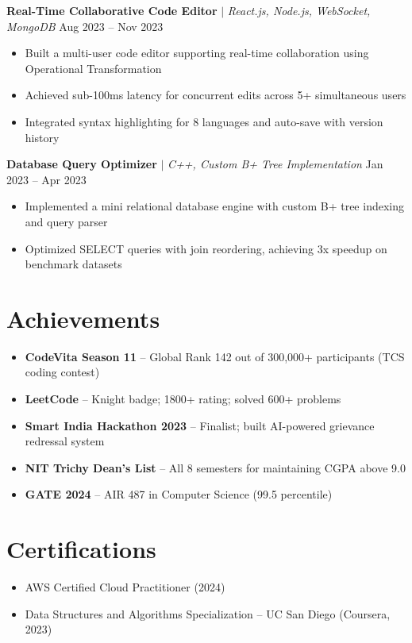 \documentclass[10pt,a4paper]{article}
\begin{document}
\textbf{Real-Time Collaborative Code Editor} $\mid$ \textit{React.js, Node.js, WebSocket, MongoDB} \hfill Aug 2023 -- Nov 2023
\begin{itemize}
    \item Built a multi-user code editor supporting real-time collaboration using Operational Transformation
    \item Achieved sub-100ms latency for concurrent edits across 5+ simultaneous users
    \item Integrated syntax highlighting for 8 languages and auto-save with version history
\end{itemize}

\textbf{Database Query Optimizer} $\mid$ \textit{C++, Custom B+ Tree Implementation} \hfill Jan 2023 -- Apr 2023
\begin{itemize}
    \item Implemented a mini relational database engine with custom B+ tree indexing and query parser
    \item Optimized SELECT queries with join reordering, achieving 3x speedup on benchmark datasets
\end{itemize}

\section{Achievements}

\begin{itemize}
    \item \textbf{CodeVita Season 11} -- Global Rank 142 out of 300,000+ participants (TCS coding contest)
    \item \textbf{LeetCode} -- Knight badge; 1800+ rating; solved 600+ problems
    \item \textbf{Smart India Hackathon 2023} -- Finalist; built AI-powered grievance redressal system
    \item \textbf{NIT Trichy Dean's List} -- All 8 semesters for maintaining CGPA above 9.0
    \item \textbf{GATE 2024} -- AIR 487 in Computer Science (99.5 percentile)
\end{itemize}

\section{Certifications}

\begin{itemize}
    \item AWS Certified Cloud Practitioner (2024)
    \item Data Structures and Algorithms Specialization -- UC San Diego (Coursera, 2023)
\end{itemize}
\end{document}
